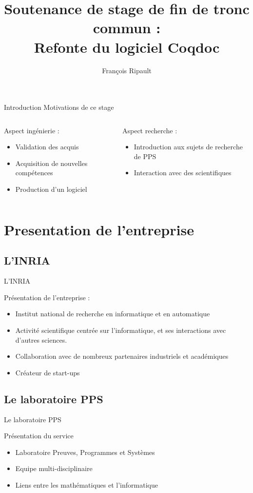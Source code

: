 \documentclass[compress]{beamer}
\title{Soutenance de stage de fin de tronc commun : \\ Refonte du logiciel Coqdoc}
\author{François Ripault}
\newenvironment{tframe}[1]{
  \subsection{#1}
  \begin{frame}{#1}
  }{
  \end{frame}
  }
\begin{document}
\begin{frame}
  \titlepage
\end{frame}

\begin{frame}{Introduction}
  Motivations de ce stage

  \vfill

  \begin{columns}[2]
    \begin{column}{0.5\textwidth}
    Aspect ingénierie :
  \begin{itemize}
    \item Validation des acquis
    \item Acquisition de nouvelles compétences
    \item Production d'un logiciel
  \end{itemize}
    \end{column}
    \begin{column}{0.5\textwidth}
      Aspect recherche :
  \begin{itemize}
    \item Introduction aux sujets de recherche
      de PPS
    \item Interaction avec des scientifiques
  \end{itemize}
    \end{column}
  \end{columns}
\end{frame}

\begin{frame}
\tableofcontents
\end{frame}

\section{Presentation de l'entreprise}
\begin{tframe}{L'INRIA}
  Présentation de l'entreprise :
  \begin{itemize}
    \item Institut national de recherche en informatique et en automatique
    \item Activité scientifique centrée sur l'informatique, et ses interactions
      avec d'autres sciences.
    \item Collaboration avec de nombreux partenaires industriels et académiques
    \item Créateur de start-ups
  \end{itemize}
\end{tframe}
\begin{tframe}{Le laboratoire PPS}
  Présentation du service
  \begin{itemize}
    \item Laboratoire Preuves, Programmes et Systèmes
    \item Equipe multi-disciplinaire
    \item Liens entre les mathématiques et l'informatique
  \end{itemize}
\end{tframe}
\end{document}
